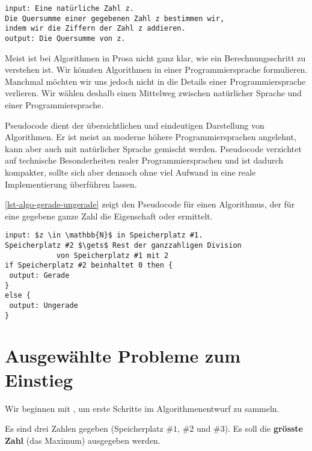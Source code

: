\begin{lstlisting}[language=pseudocode, caption={Algorithmus für die Quersumme in Prosa.}, label={lst-algo-quersumme}]
input: Eine natürliche Zahl z.
Die Quersumme einer gegebenen Zahl z bestimmen wir, 
indem wir die Ziffern der Zahl z addieren.
output: Die Quersumme von z.
\end{lstlisting}

Meist ist bei Algorithmen in Prosa nicht ganz klar, wie ein Berechnungsschritt zu verstehen ist. Wir könnten Algorithmen in einer Programmiersprache formulieren. Manchmal möchten wir uns jedoch nicht in die Details einer Programmiersprache verlieren. Wir wählen deshalb einen Mittelweg zwischen natürlicher Sprache und einer Programmiersprache.

\begin{definition}[Pseudocode]
	Pseudocode dient der übersichtlichen und eindeutigen Darstellung von Algorithmen. Er ist meist an moderne höhere Programmiersprachen angelehnt, kann aber auch mit natürlicher Sprache gemischt werden. Pseudocode verzichtet auf technische Besonderheiten realer Programmiersprachen und ist dadurch kompakter, sollte sich aber dennoch ohne viel Aufwand in eine reale Implementierung überführen lassen.
\end{definition}

\autoref{lst-algo-gerade-ungerade} zeigt den Pseudocode für einen Algorithmus, der für eine gegebene ganze Zahl die Eigenschaft  oder  ermittelt.

\begin{lstlisting}[language=pseudocode, caption={Mit $\gets$ ist \protect\say{abspeichern} gemeint.}, label={lst-algo-gerade-ungerade}]
input: $z \in \mathbb{N}$ in Speicherplatz #1.
Speicherplatz #2 $\gets$ Rest der ganzzahligen Division 
		    von Speicherplatz #1 mit 2
if Speicherplatz #2 beinhaltet 0 then {
 output: Gerade
}
else {
 output: Ungerade
}
\end{lstlisting}

\section{Ausgewählte Probleme zum Einstieg}

Wir beginnen mit , um erste Schritte im Algorithmenentwurf zu sammeln.

\begin{problem}\label{problem-max-3-zahlen}
	Es sind drei Zahlen gegeben (Speicherplatz $\#1$, $\#2$ und $\#3$). Es soll die \textbf{grösste Zahl} (das Maximum) ausgegeben werden.
\end{problem}

